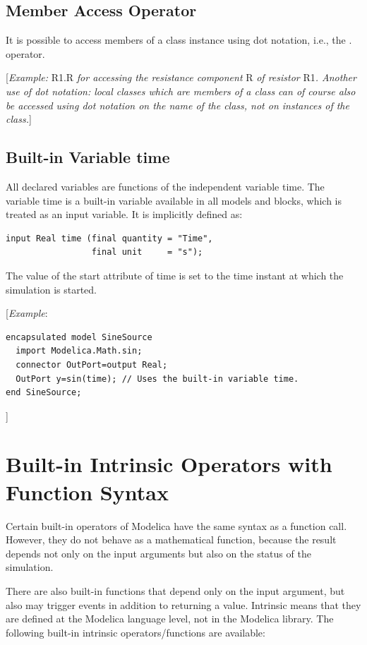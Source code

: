 \documentclass[10pt,a4paper]{report}
\def\doublelabel#1{\label{#1}\hypertarget{#1}{}}
\begin{document}
\subsection{Member Access Operator}

It is possible to access members of a class instance using dot notation,
i.e., the . operator.

{[}\emph{Example:} R1.R \emph{for accessing the resistance component} R
\emph{of resistor} R1\emph{. Another use of dot notation: local classes
which are members of a class can of course also be accessed using dot
notation on the name of the class, not on instances of the class.}{]}

\subsection{Built-in Variable time}

All declared variables are functions of the independent variable time.
The variable time is a built-in variable available in all models and
blocks, which is treated as an input variable. It is implicitly defined
as:
\begin{lstlisting}[language=modelica]
input Real time (final quantity = "Time",
                 final unit     = "s");
\end{lstlisting}

The value of the start attribute of time is set to the time instant at
which the simulation is started.

{[}\emph{Example}:
\begin{lstlisting}[language=modelica]
encapsulated model SineSource
  import Modelica.Math.sin;
  connector OutPort=output Real;
  OutPort y=sin(time); // Uses the built-in variable time.
end SineSource;
\end{lstlisting}
{]}

\section{Built-in Intrinsic Operators with Function Syntax}\doublelabel{built-in-intrinsic-operators-with-function-syntax}

Certain built-in operators of Modelica have the same syntax as a
function call. However, they do not behave as a mathematical function,
because the result depends not only on the input arguments but also on
the status of the simulation.

There are also built-in functions that depend only on the input
argument, but also may trigger events in addition to returning a value.
Intrinsic means that they are defined at the Modelica language level,
not in the Modelica library. The following built-in intrinsic
operators/functions are available:
\end{document}
